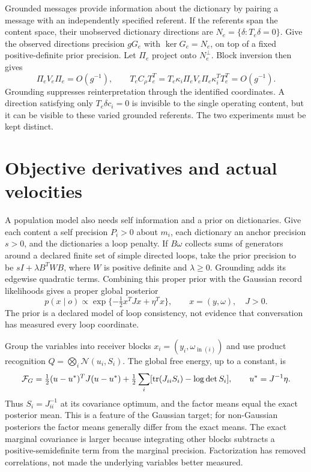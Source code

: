 Grounded messages provide information about the dictionary by pairing a message with an independently specified referent. If the referents span the content space, their unobserved dictionary directions are $N_e=\{\delta:T_e\delta=0\}$. Give the observed directions precision $gG_e$ with $\ker G_e=N_e$, on top of a fixed positive-definite prior precision. Let $\Pi_e$ project onto $N_e^\perp$. Block inversion then gives
\begin{equation}
 \Pi_eV_e\Pi_e=O(g^{-1}),\qquad
 T_eC_\rho T_e^T
 =T_e\kappa_i\Pi_eV_e\Pi_e\kappa_i^TT_e^T=O(g^{-1}).
 \label{c18:grounding}
\end{equation}
Grounding suppresses reinterpretation through the identified coordinates. A direction satisfying only $T_e\delta c_i=0$ is invisible to the single operating content, but it can be visible to these varied grounded referents. The two experiments must be kept distinct.

\section{Objective derivatives and actual velocities}

A population model also needs self information and a prior on dictionaries. Give each content a self precision $P_i>0$ about $m_i$, each dictionary an anchor precision $s>0$, and the dictionaries a loop penalty. If $B\omega$ collects sums of generators around a declared finite set of simple directed loops, take the prior precision to be $sI+\lambda B^TWB$, where $W$ is positive definite and $\lambda\geq0$. Grounding adds its edgewise quadratic terms. Combining this proper prior with the Gaussian record likelihoods gives a proper global posterior
\begin{equation}
 p(x\mid o)\propto\exp\{-\tfrac12x^TJx+\eta^Tx\},
 \qquad x=(y,\omega),\quad J>0.
 \label{c18:global}
\end{equation}
The prior is a declared model of loop consistency, not evidence that conversation has measured every loop coordinate.

Group the variables into receiver blocks $x_i=(y_i,\omega_{\operatorname{in}(i)})$ and use product recognition $Q=\bigotimes_i\mathcal N(u_i,S_i)$. The global free energy, up to a constant, is
\begin{equation}
 \mathcal F_G=\tfrac12(u-u^*)^TJ(u-u^*)
 +\tfrac12\sum_i[\operatorname{tr}(J_{ii}S_i)-\log\det S_i],
 \qquad u^*=J^{-1}\eta.
 \label{c18:global-vfe}
\end{equation}
Thus $S_i=J_{ii}^{-1}$ at its covariance optimum, and the factor means equal the exact posterior mean. This is a feature of the Gaussian target; for non-Gaussian posteriors the factor means generally differ from the exact means. The exact marginal covariance is larger because integrating other blocks subtracts a positive-semidefinite term from the marginal precision. Factorization has removed correlations, not made the underlying variables better measured.

